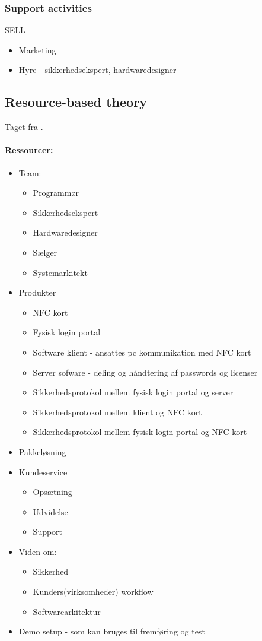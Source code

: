 \documentclass[a4paper]{article}
\begin{document}
\subsubsection*{Support activities}
SELL
\begin{itemize}
\item Marketing
\item Hyre - sikkerhedsekspert, hardwaredesigner
\end{itemize}

\subsection{Resource-based theory}
Taget fra \citet[p.~12]{rose2012software}.
\paragraph{Ressourcer:}
\begin{itemize}
\item Team:
  \begin{itemize}
  \item Programmør
  \item Sikkerhedsekspert
  \item Hardwaredesigner
  \item Sælger
  \item Systemarkitekt
  \end{itemize}
\item Produkter
  \begin{itemize}
  \item NFC kort
  \item Fysisk login portal
  \item Software klient - ansattes pc kommunikation med NFC kort
  \item Server sofware - deling og håndtering af passwords og licenser
  \item Sikkerhedsprotokol mellem fysisk login portal og server
  \item Sikkerhedsprotokol mellem klient og NFC kort
  \item Sikkerhedsprotokol mellem fysisk login portal og NFC kort
  \end{itemize}
\item Pakkeløsning
\item Kundeservice
  \begin{itemize}
  \item Opsætning
  \item Udvidelse
  \item Support
  \end{itemize}
\item Viden om:
  \begin{itemize}
  \item Sikkerhed
  \item Kunders(virksomheder) workflow
  \item Softwarearkitektur
  \end{itemize}
\item Demo setup - som kan bruges til fremføring og test
\end{itemize}
\end{document}
